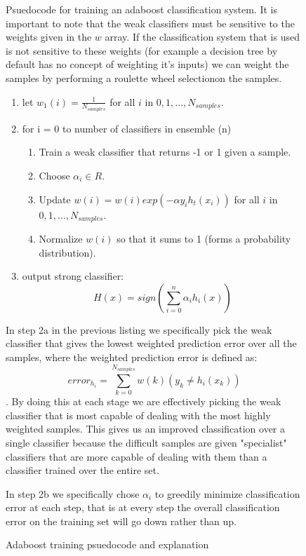 \documentclass[ %
                    author={Sam Phippen},
                supervisor={Dr. Rafal Bogacz},
                     title={Real time voice activity detectors in noisy personal computing environments},
                  subtitle={},
                    degree={MEng},
                      year={2012} ]{thesis}
\begin{document}
\begin{figure}
    Psuedocode for training an adaboost classification system. It is important
    to note that the weak classifiers must be sensitive to the weights given in
    the $w$ array. If the classification system that is used is not sensitive
    to these weights (for example a decision tree by default has no concept of
    weighting it's inputs) we can weight the samples by performing a roulette
    wheel selection\footnotemark on the samples.

    \vspace{3em}

    \begin{enumerate}

        \item let $w_1(i)=\frac{1}{N_{samples}}$ for all $i$ in
            $0,1,...,N_{samples}$.

        \item for i = 0 to number of classifiers in ensemble (n)
            \begin{enumerate}

                \item Train a weak classifier that returns -1 or 1 given a
                    sample.
                \item Choose $\alpha_i \in R$.
                \item Update $w(i) = w(i)exp(-\alpha y_i h_t(x_i))$ for all $i$ in
            $0,1,...,N_{samples}$.
            \item Normalize $w(i)$ so that it sums to 1 (forms a probability distribution).

            \end{enumerate}
        \item output strong classifier: $$H(x) = sign\left(\sum_{i=0}^{n}\alpha_i h_i(x)\right)$$
    \end{enumerate}

    \vspace{3em}

    In step 2a in the previous listing we specifically pick the weak classifier
    that gives the lowest weighted prediction error over all the samples, where
    the weighted prediction error is defined as: $$error_{h_i} =
    \sum_{k=0}^{N_{samples}} w(k)(y_k\neq h_i(x_k))$$. By doing this at each
    stage we are effectively picking the weak classifier that is most capable
    of dealing with the most highly weighted samples. This gives us an improved
    classification over a single classifier because the difficult samples are
    given "specialist" classifiers that are more capable of dealing with them
    than a classifier trained over the entire set.

    In step 2b we specifically chose $\alpha_i$ to greedily minimize
    classification error at each step, that is at every step the overall
    classification error on the training set will go down rather than up.

    \label{pseudo:adaboost}
    \caption{Adaboost training psuedocode and explanation}

\end{figure}
\end{document}
